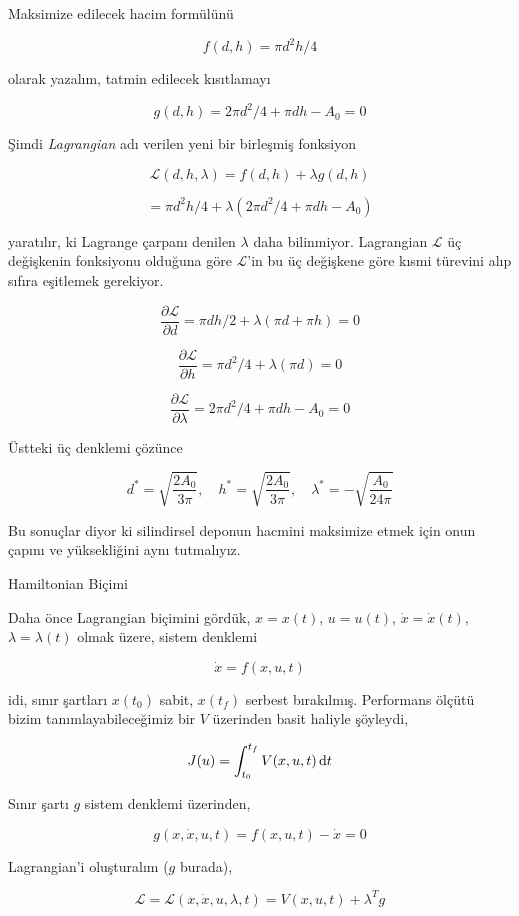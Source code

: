 \documentclass[12pt,fleqn]{article}\usepackage{../../common}
\begin{document}
Maksimize edilecek hacim formülünü 

$$
f(d,h) = \pi d^2 h / 4
$$

olarak yazalım, tatmin edilecek kısıtlamayı

$$
g(d,h) = 2 \pi d^2 / 4 + \pi d h - A_0 = 0
$$

Şimdi {\em Lagrangian} adı verilen yeni bir birleşmiş fonksiyon 

$$
\mathcal{L}(d,h,\lambda) = f(d,h) + \lambda g(d,h) 
$$

$$
= \pi d^2 h / 4 + \lambda (2 \pi d^2 / 4 + \pi d h - A_0 )
$$

yaratılır, ki Lagrange çarpanı denilen $\lambda$ daha
bilinmiyor. Lagrangian $\mathcal{L}$ üç değişkenin fonksiyonu olduğuna göre
$\mathcal{L}$'in bu üç değişkene göre kısmi türevini alıp sıfıra eşitlemek
gerekiyor. 

$$
\frac{\partial \mathcal{L}}{\partial d} = \pi d h / 2 + \lambda (\pi d + \pi h) = 0
$$

$$
\frac{\partial \mathcal{L}}{\partial h} = \pi d^2 / 4 + \lambda (\pi d) = 0 
$$

$$
\frac{\partial \mathcal{L}}{\partial \lambda} = 2\pi d^2 / 4 + \pi d h - A_0 = 0
$$

Üstteki üç denklemi çözünce 

$$
d^\ast = \sqrt{\frac{2 A_0}{3 \pi}}, \quad
h^\ast = \sqrt{\frac{2 A_0}{3 \pi}}, \quad
\lambda^\ast = -\sqrt{\frac{A_0}{24 \pi}}
$$

Bu sonuçlar diyor ki silindirsel deponun hacmini maksimize etmek için onun
çapını ve yüksekliğini aynı tutmalıyız. 

Hamiltonian Biçimi 

Daha önce Lagrangian biçimini gördük, $x=x(t)$, $u=u(t)$,
$\dot{x}=\dot{x}(t)$, $\lambda=\lambda(t)$ olmak üzere, sistem denklemi

$$
\dot{x} = f(x, u, t)
$$

idi, sınır şartları $x(t_0)$ sabit, $x(t_f)$ serbest
bırakılmış. Performans ölçütü bizim tanımlayabileceğimiz bir $V$
üzerinden basit haliyle şöyleydi,

$$
J(u) = \int_{t_0}^{t_f} V(x, u, t) \,\mathrm{d} t
$$

Sınır şartı $g$ sistem denklemi üzerinden,

$$
g(x, \dot{x}, u, t) = f(x, u, t) - \dot{x} = 0
$$

Lagrangian'i oluşturalım ($g$ burada), 

$$
\mathcal{L} = \mathcal{L}( x, \dot{x}, u, \lambda, t) =
V( x, u, t) +  \lambda^T g 
$$
\end{document}
